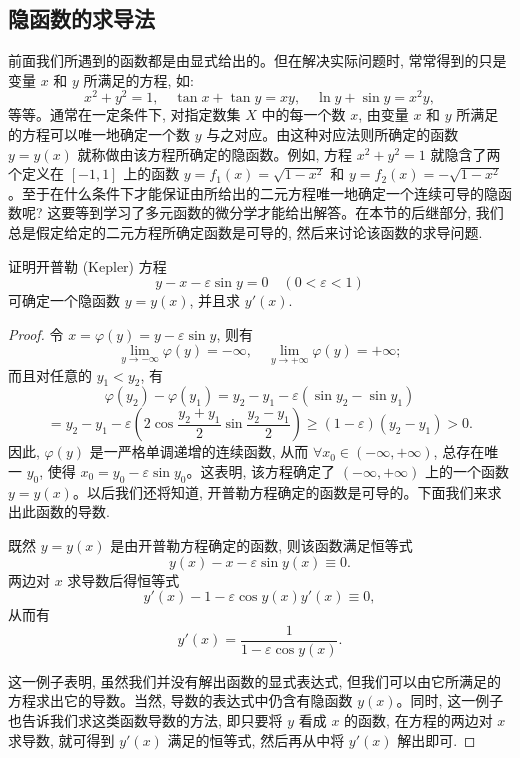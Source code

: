 \subsection{隐函数的求导法}
\label{subsec:ma-4-2-4}

前面我们所遇到的函数都是由显式给出的。但在解决实际问题时, 常常得到的只是变量 $x$ 和 $y$ 所满足的方程, 如:
\[
  x^2+y^2=1,\quad \tan x+\tan y=xy,\quad \ln y+\sin y=x^2y,
\]
等等。通常在一定条件下, 对指定数集 $X$ 中的每一个数 $x$, 由变量 $x$ 和 $y$ 所满足的方程可以唯一地确定一个数 $y$ 与之对应。由这种对应法则所确定的函数 $y=y(x)$ 就称做由该方程所确定的隐函数。例如, 方程 $x^2+y^2=1$ 就隐含了两个定义在 $[-1,1]$ 上的函数 $y=f_1(x)=\sqrt{1-x^2}$ 和 $y=f_2(x)=-\sqrt{1-x^2}$。至于在什么条件下才能保证由所给出的二元方程唯一地确定一个连续可导的隐函数呢? 这要等到学习了多元函数的微分学才能给出解答。在本节的后继部分, 我们总是假定给定的二元方程所确定函数是可导的, 然后来讨论该函数的求导问题.

\begin{example}\label{example:ma-4-2-9}
证明开普勒 (Kepler) 方程
\[
  y-x-\varepsilon\sin y=0
  \quad(0<\varepsilon<1)
\]
可确定一个隐函数 $y=y(x)$, 并且求 $y'(x)$.
\end{example}


\begin{proof}
令 $x=\varphi(y)=y-\varepsilon\sin y$, 则有
\[
  \lim_{y\to-\infty}\varphi(y)=-\infty,
  \quad
  \lim_{y\to+\infty}\varphi(y)=+\infty;
\]
而且对任意的 $y_1<y_2$, 有
\[
  \varphi(y_2)-\varphi(y_1)
  =
  y_2-y_1-\varepsilon(\sin y_2-\sin y_1)
\]
\[
  =
  y_2-y_1-\varepsilon\left(2\cos\frac{y_2+y_1}{2}\sin\frac{y_2-y_1}{2}\right)
  \geqslant(1-\varepsilon)(y_2-y_1)>0.
\]
因此, $\varphi(y)$ 是一严格单调递增的连续函数, 从而 $\forall x_0\in(-\infty,+\infty)$, 总存在唯一 $y_0$, 使得 $x_0=y_0-\varepsilon\sin y_0$。这表明, 该方程确定了 $(-\infty,+\infty)$ 上的一个函数 $y=y(x)$。以后我们还将知道, 开普勒方程确定的函数是可导的。下面我们来求出此函数的导数.

既然 $y=y(x)$ 是由开普勒方程确定的函数, 则该函数满足恒等式
\[
  y(x)-x-\varepsilon\sin y(x)\equiv0.
\]
两边对 $x$ 求导数后得恒等式
\[
  y'(x)-1-\varepsilon\cos y(x)y'(x)\equiv0,
\]
从而有
\[
  y'(x)=\frac1{1-\varepsilon\cos y(x)}.
\]

这一例子表明, 虽然我们并没有解出函数的显式表达式, 但我们可以由它所满足的方程求出它的导数。当然, 导数的表达式中仍含有隐函数 $y(x)$。同时, 这一例子也告诉我们求这类函数导数的方法, 即只要将 $y$ 看成 $x$ 的函数, 在方程的两边对 $x$ 求导数, 就可得到 $y'(x)$ 满足的恒等式, 然后再从中将 $y'(x)$ 解出即可.
\end{proof}



